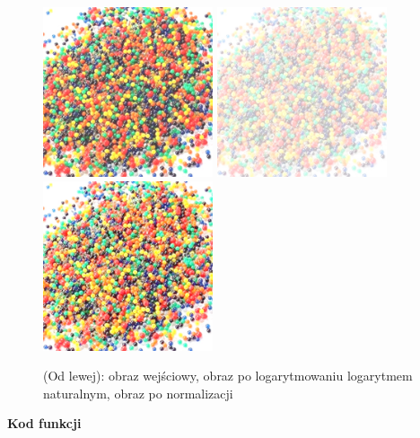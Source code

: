 \documentclass[magisterska,openany]{pracadypl}
\begin{document}
\begin{figure}[h]
\centering
\includegraphics[width=5cm, height=5cm]{orgi/RGBkulki.jpg}
\includegraphics[width=5cm, height=5cm]{4_10/logRGB2.jpg}
\includegraphics[width=5cm, height=5cm]{4_10/nlogRGB2.jpg}
\caption{(Od lewej): obraz wejściowy, obraz po logarytmowaniu logarytmem
naturalnym, obraz po normalizacji}
\end{figure}

\newpage
\textbf{\Large Kod funkcji}
   
\end{document}

